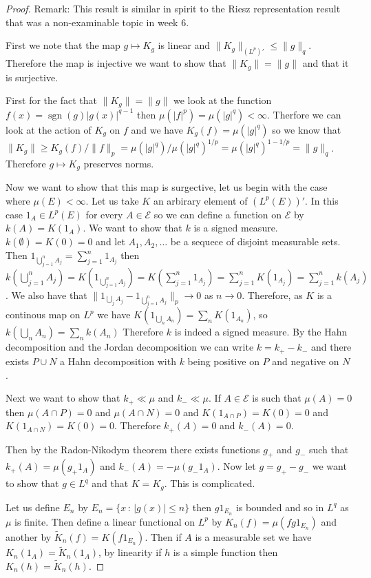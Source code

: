 \documentclass[11pt]{article}
\DeclareMathOperator{\sgn}{sgn}
\theoremstyle{definition}
\theoremstyle{remark}
\begin{document}
\begin{proof}
Remark: This result is similar in spirit to the Riesz representation result that was a non-examinable topic in week 6. 

First we note that the map $g \mapsto K_g$ is linear and $\|K_g\|_{(L^p)'} \leq \|g\|_q$. Therefore the map is injective we want to show that $\|K_g\| = \|g\|$ and that it is surjective. 

First for the fact that $\|K_g\| = \|g\|$ we look at the function $f(x) = \sgn(g)|g(x)|^{q-1}$ then $\mu(|f|^p) = \mu(|g|^q) < \infty$. Therfore we can look at the action of $K_g$ on $f$ and we have $K_g(f) = \mu(|g|^q)$ so we know that $\|K_g\| \geq K_g(f)/\|f\|_p = \mu(|g|^q)/\mu(|g|^q)^{1/p} = \mu(|g|^q)^{1-1/p} = \|g\|_q$. Therefore $g \mapsto K_g$ preserves norms.

Now we want to show that this map is surgective, let us begin with the case where $\mu(E)<\infty$. Let us take $K$ an arbirary  element of $(L^p(E))'$. In this case $1_A \in L^p(E)$ for every $A \in \mathcal{E}$ so we can define a function on $\mathcal{E}$ by $k(A)=K(1_A)$. We want to show that $k$ is a signed measure. $k(\emptyset)=K(0)=0$ and let $A_1,A_2,\dots$ be a sequece of disjoint measurable sets. Then $1_{\bigcup_{j=1}^n A_j} = \sum_{j=1}^n 1_{A_j}$ then $k(\bigcup_{j=1}^n A_j) = K(1_{\bigcup_{j=1}^n A_j}) = K( \sum_{j=1}^n 1_{A_j}) = \sum_{j=1}^n K(1_{A_j}) = \sum_{j=1}^n k(A_j)$. We also have that $\| 1_{\bigcup_j A_j} - 1_{\bigcup_{j=1}^n A_j} \|_p \rightarrow 0$ as $n \rightarrow 0$. Therefore, as $K$ is a continous map on $L^p$ we have $K(1_{\bigcup_n A_n}) = \sum_n K(1_{A_n})$, so $k(\bigcup_n A_n) = \sum_n k(A_n)$ Therefore $k$ is indeed a signed measure. By the Hahn decomposition and the Jordan decomposition we can write $k = k_+ - k_-$ and there exists $P \cup N$ a Hahn decomposition with $k$ being positive on $P$ and negative on $N$.

Next we want to show that $k_+ \ll \mu$ and $k_- \ll \mu$. If $A \in \mathcal{E}$ is such that $\mu(A) = 0$ then $\mu(A \cap P)=0$ and $\mu(A \cap N) = 0$ and $K(1_{A \cap P}) = K(0) = 0$ and $K(1_{A \cap N}) = K(0) = 0$. Therefore $k_+(A) = 0$ and $k_-(A) = 0$.

Then by the Radon-Nikodym theorem there exists functions $g_+$ and $g_-$ such that $k_+(A) = \mu(g_+1_A)$ and $k_-(A) = - \mu(g_- 1_A)$. Now let $g = g_+ - g_-$ we want to show that $g \in L^q$ and that $K = K_g$. This is complicated.

Let us define $E_n$ by $E_n = \{ x \,:\, |g(x)| \leq n\}$ then $g1_{E_n}$ is bounded and so in $L^q$ as $\mu$ is finite. Then define a linear functional on $L^p$ by $K_n(f) = \mu(fg1_{E_n})$ and another by $\tilde{K}_n (f) = K(f1_{E_n})$. Then if $A$ is a measurable set we have $K_n (1_A) = \tilde{K}_n (1_A)$, by linearity if $h$ is a simple function then $K_n(h) = \tilde{K}_n(h)$.


\end{proof}
\end{document}
